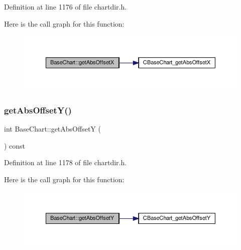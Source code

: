 Definition at line 1176 of file chartdir.\+h.

Here is the call graph for this function\+:
\nopagebreak
\begin{figure}[H]
\begin{center}
\leavevmode
\includegraphics[width=350pt]{class_base_chart_a57090d85dc5afd9ecc627e8727c00d19_cgraph}
\end{center}
\end{figure}
\mbox{\label{class_base_chart_a46db46e9ba9ac9bc9ef111a6e82221c0}} 
\subsubsection{\texorpdfstring{get\+Abs\+Offset\+Y()}{getAbsOffsetY()}}
{\footnotesize\ttfamily int Base\+Chart\+::get\+Abs\+OffsetY (\begin{DoxyParamCaption}{ }\end{DoxyParamCaption}) const\hspace{0.3cm}{\ttfamily [inline]}}



Definition at line 1178 of file chartdir.\+h.

Here is the call graph for this function\+:
\nopagebreak
\begin{figure}[H]
\begin{center}
\leavevmode
\includegraphics[width=350pt]{class_base_chart_a46db46e9ba9ac9bc9ef111a6e82221c0_cgraph}
\end{center}
\end{figure}
\mbox{\label{class_base_chart_a3dd3942f4e9685be181a34309a7f5b7d}} 
